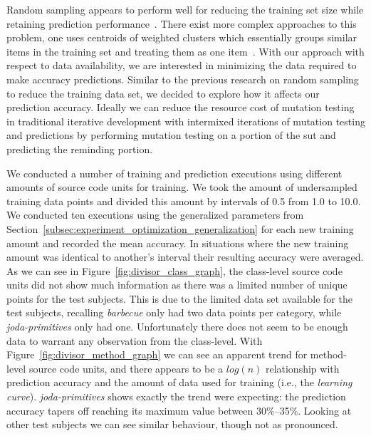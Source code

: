 Random sampling appears to perform well for reducing the training set size while retaining prediction performance~\cite{PJO99, WNC05}. There exist more complex approaches to this problem, one uses centroids of weighted clusters which essentially groups similar items in the training set and treating them as one item~\cite{NBP08}. With our approach with respect to data availability, we are interested in minimizing the data required to make accuracy predictions. Similar to the previous research on random sampling to reduce the training data set, we decided to explore how it affects our prediction accuracy. Ideally we can reduce the resource cost of mutation testing in traditional iterative development with intermixed iterations of mutation testing and predictions by performing mutation testing on a portion of the \gls{sut} and predicting the reminding portion. 

We conducted a number of training and prediction executions using different amounts of source code units for training. We took the amount of undersampled training data points and divided this amount by intervals of 0.5 from 1.0 to 10.0. We conducted ten executions using the generalized parameters from Section~\ref{subsec:experiment_optimization_generalization} for each new training amount and recorded the mean accuracy. In situations where the new training amount was identical to another's interval their resulting accuracy were averaged. As we can see in Figure~\ref{fig:divisor_class_graph}, the class-level source code units did not show much information as there was a limited number of unique points for the test subjects. This is due to the limited data set available for the test subjects, recalling \emph{barbecue} only had two data points per category, while \emph{joda-primitives} only had one. Unfortunately there does not seem to be enough data to warrant any observation from the class-level. With Figure~\ref{fig:divisor_method_graph} we can see an apparent trend for method-level source code units, and there appears to be a $log(n)$ relationship with prediction accuracy and the amount of data used for training (i.e., the \emph{learning curve}). \emph{joda-primitives} shows exactly the trend were expecting: the prediction accuracy tapers off reaching its maximum value between 30\%--35\%. Looking at other test subjects we can see similar behaviour, though not as pronounced.

